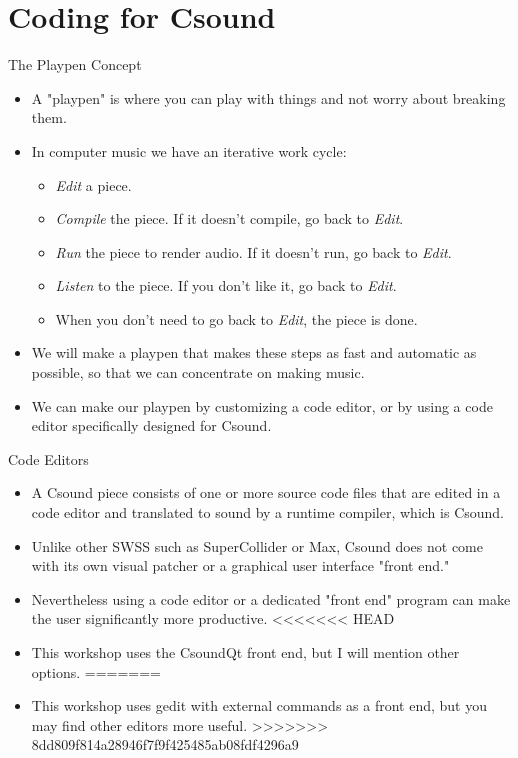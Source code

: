\documentclass{beamer}
\begin{document}
    \section{Coding for Csound}
    
    \begin{frame}{The Playpen Concept}
        \begin{itemize}
            \item A "playpen" is where you can play with things and not worry 
            about breaking them.
            \item In computer music we have an iterative work cycle:
            	\begin{itemize}
		   \item \textit{Edit} a piece.
		   \item \textit{Compile} the piece. If it doesn't compile, go back to \textit{Edit}.
		   \item \textit{Run} the piece to render audio. If it doesn't run, go back to \emph{Edit}.
		   \item \textit{Listen} to the piece. If you don't like it, go back to \emph{Edit}.
		   \item When you don't need to go back to \emph{Edit}, the piece is done.
	        \end{itemize}
            \item  We will make a playpen that makes these steps as fast and 
            automatic as possible, so that we can concentrate on making music.
            \item We can make our playpen by customizing a code editor, or by 
            using a code editor specifically designed for Csound.
          \end{itemize}    
    \end{frame}
    
    \begin{frame}{Code Editors}
        \begin{itemize}
            \item A Csound piece consists of one or more source code files that are
            edited in a code editor and translated to sound by a runtime compiler, which is
            Csound.
            \item Unlike other SWSS such as SuperCollider or Max, Csound does not
            come with its own visual patcher or a graphical user interface "front end."
            \item Nevertheless using a code editor or a dedicated "front end"
            program can make the user significantly more productive.
<<<<<<< HEAD
            \item This workshop uses the CsoundQt front end, but I will mention
            other options.
=======
            \item This workshop uses gedit with external commands as a front end, but you 
            may find other editors more useful.
>>>>>>> 8dd809f814a28946f7f9f425485ab08fdf4296a9
        \end{itemize}
    \end{frame}
    
\end{document}
